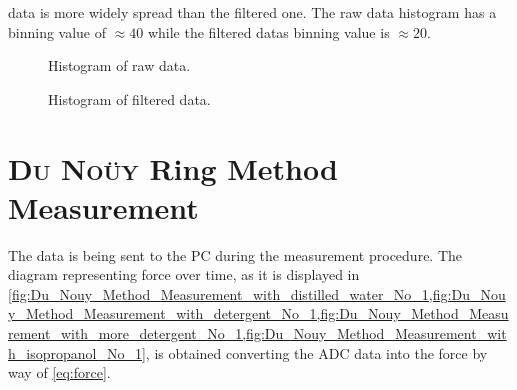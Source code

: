         data is more widely spread than the filtered one. The raw data histogram has a binning value of \(\approx 40\) while the
        filtered datas binning value is \(\approx 20\).\par\medskip
        \begin{figure}[h]
            \centering
            
            \caption[Histogram of raw data]{Histogram of raw data.}
            \label{fig:histogram_raw_data}
        \end{figure}
        
        \begin{figure}[h]
            \centering
            
            \caption[Histogram of filtered data]{Histogram of filtered data.}
            \label{fig:histogram_filtered_data}
        \end{figure}
    \section{\textsc{Du Noüy} Ring Method Measurement}
        The data is being sent to the PC during the measurement procedure. The diagram representing force over time, as it
        is displayed in \cref{fig:Du_Nouy_Method_Measurement_with_distilled_water_No_1,fig:Du_Nouy_Method_Measurement_with_detergent_No_1,fig:Du_Nouy_Method_Measurement_with_more_detergent_No_1,fig:Du_Nouy_Method_Measurement_with_isopropanol_No_1}, is obtained converting the ADC data into the force by way of \cref{eq:force}. 
